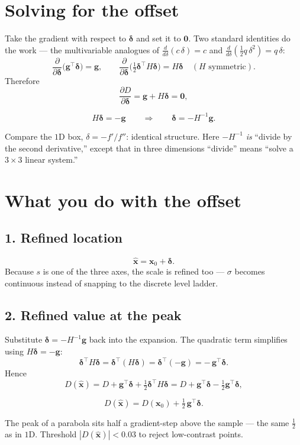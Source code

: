 \documentclass[11pt]{article}
\begin{document}
\section{Solving for the offset}

Take the gradient with respect to $\boldsymbol{\delta}$ and set it to $\mathbf{0}$. Two
standard identities do the work --- the multivariable analogues of
$\frac{d}{d\delta}(c\,\delta) = c$ and
$\frac{d}{d\delta}(\tfrac{1}{2} q\,\delta^2) = q\,\delta$:
\[
\frac{\partial}{\partial \boldsymbol{\delta}}\big(\mathbf{g}^{\top}\boldsymbol{\delta}\big)
= \mathbf{g},
\qquad
\frac{\partial}{\partial \boldsymbol{\delta}}
\big(\tfrac{1}{2}\boldsymbol{\delta}^{\top} H \boldsymbol{\delta}\big)
= H\boldsymbol{\delta}
\quad (\text{$H$ symmetric}).
\]
Therefore
\[
\frac{\partial D}{\partial \boldsymbol{\delta}}
= \mathbf{g} + H\boldsymbol{\delta} = \mathbf{0},
\]
\begin{keybox}
\[
H\boldsymbol{\delta} = -\mathbf{g}
\qquad\Longrightarrow\qquad
\boldsymbol{\delta} = -H^{-1}\mathbf{g}.
\]
\end{keybox}
Compare the $1$D box, $\delta = -f'/f''$: identical structure. Here $-H^{-1}$ \emph{is}
``divide by the second derivative,'' except that in three dimensions ``divide'' means
``solve a $3\times 3$ linear system.''

\section{What you do with the offset}

\subsection*{1. Refined location}
\[
\hat{\mathbf{x}} = \mathbf{x}_0 + \boldsymbol{\delta}.
\]
Because $s$ is one of the three axes, the scale is refined too --- $\sigma$ becomes
continuous instead of snapping to the discrete level ladder.

\subsection*{2. Refined value at the peak}
Substitute $\boldsymbol{\delta} = -H^{-1}\mathbf{g}$ back into the expansion. The quadratic
term simplifies using $H\boldsymbol{\delta} = -\mathbf{g}$:
\[
\boldsymbol{\delta}^{\top} H \boldsymbol{\delta}
= \boldsymbol{\delta}^{\top}(H\boldsymbol{\delta})
= \boldsymbol{\delta}^{\top}(-\mathbf{g})
= -\,\mathbf{g}^{\top}\boldsymbol{\delta}.
\]
Hence
\[
D(\hat{\mathbf{x}})
= D + \mathbf{g}^{\top}\boldsymbol{\delta}
+ \tfrac{1}{2}\boldsymbol{\delta}^{\top} H \boldsymbol{\delta}
= D + \mathbf{g}^{\top}\boldsymbol{\delta} - \tfrac{1}{2}\mathbf{g}^{\top}\boldsymbol{\delta},
\]
\begin{keybox}
\[
D(\hat{\mathbf{x}}) = D(\mathbf{x}_0) + \tfrac{1}{2}\,\mathbf{g}^{\top}\boldsymbol{\delta}.
\]
\end{keybox}
The peak of a parabola sits half a gradient-step above the sample --- the same $\tfrac12$
as in $1$D. Threshold $|D(\hat{\mathbf{x}})| < 0.03$ to reject low-contrast points.
\end{document}
